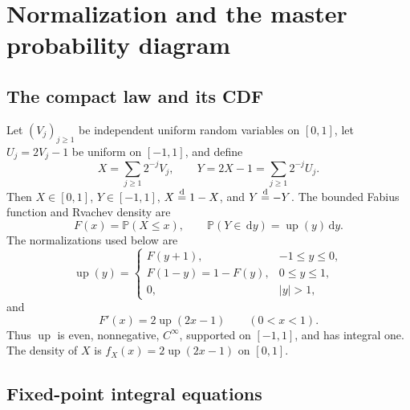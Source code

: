 \documentclass[11pt]{article}
\theoremstyle{definition}
\theoremstyle{remark}
\newcommand{\Prob}{\mathbb P}
\newcommand{\dd}{\,\mathrm d}
\newcommand{\Up}{\operatorname{up}}
\begin{document}
\section{Normalization and the master probability diagram}
\label{p2:sec:normalization}

\subsection{The compact law and its CDF}

Let $(V_j)_{j\ge1}$ be independent uniform random variables on $[0,1]$, let
$U_j=2V_j-1$ be uniform on $[-1,1]$, and define
\begin{equation}
 X=\sum_{j\ge1}2^{-j}V_j,
 \qquad
 Y=2X-1=\sum_{j\ge1}2^{-j}U_j.                       \label{p2:eq:XY}
\end{equation}
Then $X\in[0,1]$, $Y\in[-1,1]$, $X\mathrel{\stackrel{\mathrm d}=}1-X$, and $Y\mathrel{\stackrel{\mathrm d}=}-Y$.  The bounded Fabius
function and Rvachev density are
\begin{equation}
 F(x)=\Prob(X\le x),
 \qquad
 \Prob(Y\in\dd y)=\Up(y)\dd y.                       \label{p2:eq:F-up-law}
\end{equation}
The normalizations used below are
\begin{equation}
 \Up(y)=
 \begin{cases}
 F(y+1),&-1\le y\le0,\\
 F(1-y)=1-F(y),&0\le y\le1,\\
 0,&|y|>1,
 \end{cases}                                           \label{p2:eq:F-up-link}
\end{equation}
and
\begin{equation}
 F'(x)=2\Up(2x-1)\qquad(0<x<1).                         \label{p2:eq:Fprime-up}
\end{equation}
Thus $\Up$ is even, nonnegative, $C^\infty$, supported on $[-1,1]$, and has integral one.
The density of $X$ is $f_X(x)=2\Up(2x-1)$ on $[0,1]$.

\subsection{Fixed-point integral equations}
\end{document}
